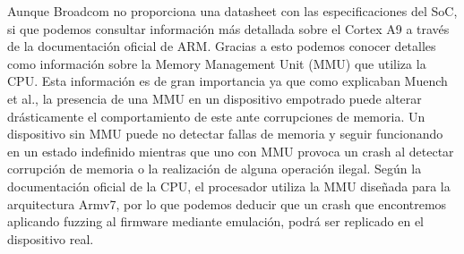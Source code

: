 Aunque Broadcom no proporciona una datasheet con las especificaciones del SoC, 
si que podemos consultar información más detallada sobre el Cortex A9 a través de la documentación oficial de ARM\cite{cortexA9}. Gracias a esto podemos 
conocer detalles como información sobre la Memory Management Unit (MMU) que utiliza la CPU. Esta información es de gran importancia ya que como explicaban
Muench et al.\cite{Muench2018}, la presencia de una MMU en un dispositivo empotrado puede alterar drásticamente el comportamiento de este ante corrupciones de 
memoria. Un dispositivo sin MMU puede no detectar fallas de memoria y seguir funcionando en un estado indefinido mientras que uno con MMU provoca un 
crash al detectar corrupción de memoria o la realización de alguna operación ilegal. Según la documentación oficial de la CPU, el procesador utiliza la MMU 
diseñada para la arquitectura Armv7, por lo que podemos deducir que un crash que encontremos aplicando fuzzing al firmware mediante emulación, podrá ser replicado
en el dispositivo real.

